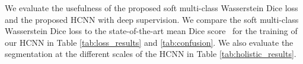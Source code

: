 \documentclass[runningheads,orivec,a4paper]{llncs}
\begin{document}
We evaluate the usefulness of the proposed soft multi-class Wasserstein Dice loss and the proposed HCNN with deep supervision. We compare the soft multi-class Wasserstein Dice loss to the state-of-the-art mean Dice score~\cite{scalenet,highresnet} for the training of our HCNN in Table \ref{tab:loss_results} and \ref{tab:confusion}. We also evaluate the segmentation at the different scales of the HCNN in Table \ref{tab:holistic_results}.

%		
\end{document}
